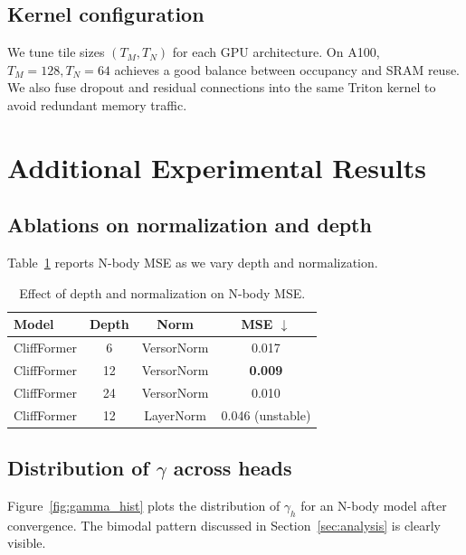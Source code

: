 \documentclass{article}
\theoremstyle{plain}
\theoremstyle{definition}
\theoremstyle{remark}
\begin{document}
\subsection{Kernel configuration}

We tune tile sizes $(T_M,T_N)$ for each GPU architecture. On A100, $T_M=128, T_N=64$ achieves a good balance between occupancy and SRAM reuse. We also fuse dropout and residual connections into the same Triton kernel to avoid redundant memory traffic.

\section{Additional Experimental Results}

\subsection{Ablations on normalization and depth}

Table~\ref{tab:norm_depth} reports N-body MSE as we vary depth and normalization.

\begin{table}[h]
\caption{Effect of depth and normalization on N-body MSE.}
\label{tab:norm_depth}
\vskip 0.1in
\begin{center}
\begin{small}
\begin{sc}
\begin{tabular}{lccc}
\toprule
Model & Depth & Norm & MSE $\downarrow$ \\
\midrule
CliffFormer & 6  & VersorNorm & 0.017 \\
CliffFormer & 12 & VersorNorm & \textbf{0.009} \\
CliffFormer & 24 & VersorNorm & 0.010 \\
CliffFormer & 12 & LayerNorm  & 0.046 (unstable) \\
\bottomrule
\end{tabular}
\end{sc}
\end{small}
\end{center}
\vskip -0.1in
\end{table}

\subsection{Distribution of $\gamma$ across heads}
\label{app:gamma}

Figure~\ref{fig:gamma_hist} plots the distribution of $\gamma_h$ for an N-body model after convergence. The bimodal pattern discussed in Section~\ref{sec:analysis} is clearly visible.
\end{document}
